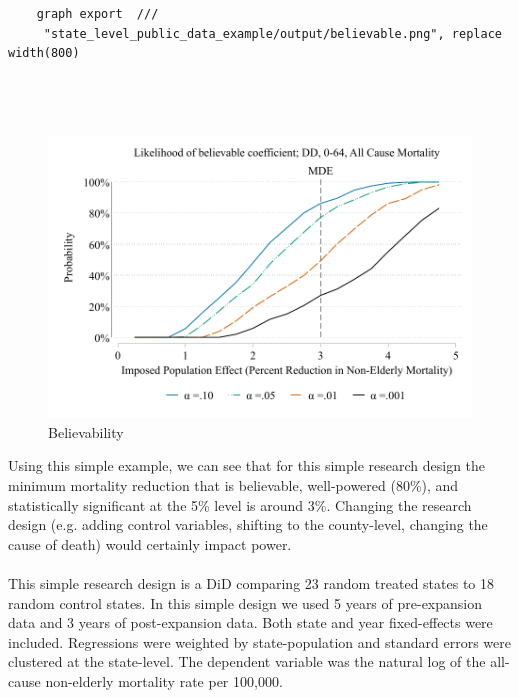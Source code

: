 \documentclass[12pt]{article}%
\begin{document}
\begin{appendices}
\begin{footnotesize}
\begin{verbatim}
    graph export  /// 
     "state_level_public_data_example/output/believable.png", replace width(800)

        
 
 \end{verbatim}
 \end{footnotesize}
\FloatBarrier

\begin{figure}
  \caption{Believability}
      \includegraphics[width=\linewidth]{../state_level_public_data_example/output/believable.pdf}  
\end{figure}

\FloatBarrier
 Using this simple example, we can see that for this simple research design the minimum mortality reduction that is believable, well-powered (80\%), and statistically significant at the 5\% level is around 3\%. Changing the research design (e.g. adding control variables, shifting to the county-level, changing the cause of death) would certainly impact power. \\
~\\
This simple research design is a DiD comparing 23 random treated states to 18 random control states. In this simple design we used 5 years of pre-expansion data and 3 years of post-expansion data. Both state and year fixed-effects were included. Regressions were weighted by state-population and standard errors were clustered at the state-level. The dependent variable was the natural log of the all-cause non-elderly mortality rate per 100,000.


\end{appendices}
\end{document}
